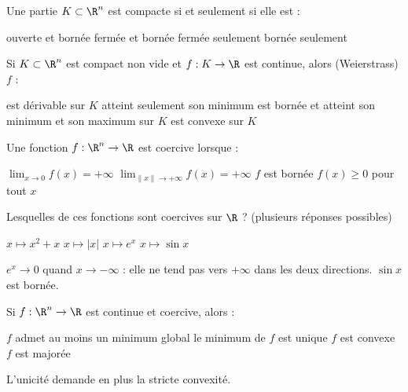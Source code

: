
\begin{question}
Une partie $K\subset\R^n$ est compacte si et seulement si elle est :
\begin{reponses}
  \mauvaise ouverte et bornée
  \bonne fermée et bornée
  \mauvaise fermée seulement
  \mauvaise bornée seulement
\end{reponses}
\end{question}

\begin{question}
Si $K\subset\R^n$ est compact non vide et $f:K\to\R$ est continue, alors (Weierstrass) $f$ :
\begin{reponses}
  \mauvaise est dérivable sur $K$
  \mauvaise atteint seulement son minimum
  \bonne est bornée et atteint son minimum et son maximum sur $K$
  \mauvaise est convexe sur $K$
\end{reponses}
\end{question}

\begin{question}
Une fonction $f:\R^n\to\R$ est coercive lorsque :
\begin{reponses}
  \mauvaise $\displaystyle\lim_{x\to0}f(x)=+\infty$
  \bonne $\displaystyle\lim_{\|x\|\to+\infty}f(x)=+\infty$
  \mauvaise $f$ est bornée
  \mauvaise $f(x)\ge0$ pour tout $x$
\end{reponses}
\end{question}

\begin{question}
Lesquelles de ces fonctions sont coercives sur $\R$ ? (plusieurs réponses possibles)
\begin{reponses}
  \bonne $x\mapsto x^2+x$
  \bonne $x\mapsto|x|$
  \mauvaise $x\mapsto e^{x}$
  \mauvaise $x\mapsto\sin x$
\end{reponses}
\begin{explication}
$e^x\to0$ quand $x\to-\infty$ : elle ne tend pas vers $+\infty$ dans les deux directions. $\sin x$ est bornée.
\end{explication}
\end{question}

\begin{question}
Si $f:\R^n\to\R$ est continue et coercive, alors :
\begin{reponses}
  \bonne $f$ admet au moins un minimum global
  \mauvaise le minimum de $f$ est unique
  \mauvaise $f$ est convexe
  \mauvaise $f$ est majorée
\end{reponses}
\begin{explication}
L'unicité demande en plus la stricte convexité.
\end{explication}
\end{question}

